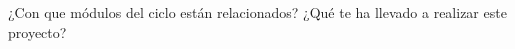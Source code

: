 \clearpage
{}

¿Con que módulos del ciclo están relacionados? ¿Qué te ha llevado a realizar este proyecto?
